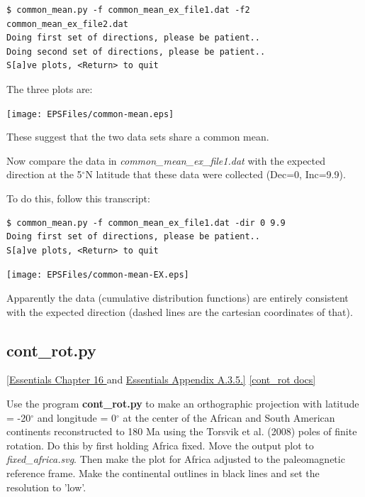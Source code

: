 \documentclass[11pt]{book}
\begin{document}
{{{\begin{verbatim}
$ common_mean.py -f common_mean_ex_file1.dat -f2 common_mean_ex_file2.dat
Doing first set of directions, please be patient..
Doing second set of directions, please be patient..
S[a]ve plots, <Return> to quit
\end{verbatim}

\noindent The three plots are:

{ %
  \texttt{[image: EPSFiles/common-mean.eps]}}

These suggest that  the two data sets share a common mean.

Now compare the data in  {\it common\_mean\_ex\_file1.dat }  with the expected direction at the 5$^{\circ}$N latitude that these data were collected (Dec=0, Inc=9.9).

To do this,  follow this transcript:

\begin{verbatim}
$ common_mean.py -f common_mean_ex_file1.dat -dir 0 9.9
Doing first set of directions, please be patient..
S[a]ve plots, <Return> to quit
\end{verbatim}

{%
  \texttt{[image: EPSFiles/common-mean-EX.eps]}}

Apparently the data (cumulative distribution functions) are entirely consistent with the expected direction (dashed lines are the cartesian coordinates of that).



\subsection{cont\_rot.py}
\href{http://earthref.org/MAGIC/books/Tauxe/Essentials/WebBook3ch16.html#ch16}{[Essentials Chapter 16 }and \href{http://earthref.org/MAGIC/books/Tauxe/Essentials/WebBook3ap1.html#polerot}{Essentials Appendix A.3.5.]}
\href{https://github.com/PmagPy/PmagPy/blob/master/programs/cont_rot.py}{[cont\_rot docs]}

Use the program {\bf cont\_rot.py} to make an orthographic projection with latitude = -20$^{\circ}$ and longitude = 0$^{\circ}$ at the center of the African and South American  continents reconstructed to 180 Ma using the Torsvik et al. (2008) poles of finite rotation.  \nocite{torsvik08} Do this by first holding Africa fixed.  Move the output plot to {\it fixed\_africa.svg}.  Then make the plot for Africa adjusted  to the paleomagnetic reference frame.  Make the continental outlines in black lines and set the resolution to 'low'.

}}}
\end{document}
